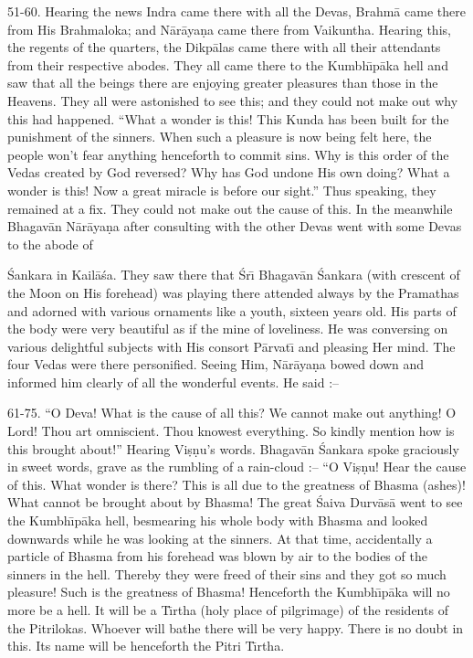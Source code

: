 51-60. Hearing the news Indra came there with all the Devas, Brahm\=a came there from His Brahmaloka; and N\=ar\=aya\d{n}a came there from Vaikuntha. Hearing this, the regents of the quarters, the Dikp\=alas came there with all their attendants from their respective abodes. They all came there to the Kumbh\={\i}p\=aka hell and saw that all the beings there are enjoying greater pleasures than those in the Heavens. They all were astonished to see this; and they could not make out why this had happened. ``What a wonder is this! This Kunda has been built for the punishment of the sinners. When such a pleasure is now being felt here, the people won't fear anything henceforth to commit sins. Why is this order of the Vedas created by God reversed? Why has God undone His own doing? What a wonder is this! Now a great miracle is before our sight.'' Thus speaking, they remained at a fix. They could not make out the cause of this. In the meanwhile Bhagav\=an N\=ar\=aya\d{n}a after consulting with the other Devas went with some Devas to the abode of

\'Sankara in Kail\=a\'sa. They saw there that \'Sr\={\i} Bhagav\=an \'Sankara (with crescent of the Moon on His forehead) was playing there attended always by the Pramathas and adorned with various ornaments like a youth, sixteen years old. His parts of the body were very beautiful as if the mine of loveliness. He was conversing on various delightful subjects with His consort P\=arvat\={\i} and pleasing Her mind. The four Vedas were there personified. Seeing Him, N\=ar\=aya\d{n}a bowed down and informed him clearly of all the wonderful events. He said :--

61-75. ``O Deva! What is the cause of all this? We cannot make out anything! O Lord! Thou art omniscient. Thou knowest everything. So kindly mention how is this brought about!'' Hearing Vi\d{s}\d{n}u's words. Bhagav\=an \'Sankara spoke graciously in sweet words, grave as the rumbling of a rain-cloud :-- ``O Vi\d{s}\d{n}u! Hear the cause of this. What wonder is there? This is all due to the greatness of Bhasma (ashes)! What cannot be brought about by Bhasma! The great \'Saiva Durv\=as\=a went to see the Kumbh\={\i}p\=aka hell, besmearing his whole body with Bhasma and looked downwards while he was looking at the sinners. At that time, accidentally a particle of Bhasma from his forehead was blown by air to the bodies of the sinners in the hell. Thereby they were freed of their sins and they got so much pleasure! Such is the greatness of Bhasma! Henceforth the Kumbh\={\i}p\=aka will no more be a hell. It will be a T\={\i}rtha (holy place of pilgrimage) of the residents of the Pitrilokas. Whoever will bathe there will be very happy. There is no doubt in this. Its name will be henceforth the Pitri T\={\i}rtha.

